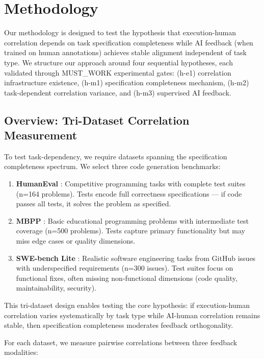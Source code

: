 \section{Methodology}

Our methodology is designed to test the hypothesis that execution-human correlation depends on task specification completeness while AI feedback (when trained on human annotations) achieves stable alignment independent of task type. We structure our approach around four sequential hypotheses, each validated through MUST\_WORK experimental gates: (h-e1) correlation infrastructure existence, (h-m1) specification completeness mechanism, (h-m2) task-dependent correlation variance, and (h-m3) supervised AI feedback.

\subsection{Overview: Tri-Dataset Correlation Measurement}

To test task-dependency, we require datasets spanning the specification completeness spectrum. We select three code generation benchmarks:

\begin{enumerate}
\item \textbf{HumanEval} \cite{chen2021evaluating}: Competitive programming tasks with complete test suites (n=164 problems). Tests encode full correctness specifications --- if code passes all tests, it solves the problem as specified.

\item \textbf{MBPP} \cite{austin2021program}: Basic educational programming problems with intermediate test coverage (n=500 problems). Tests capture primary functionality but may miss edge cases or quality dimensions.

\item \textbf{SWE-bench Lite} \cite{jimenez2023swe}: Realistic software engineering tasks from GitHub issues with underspecified requirements (n=300 issues). Test suites focus on functional fixes, often missing non-functional dimensions (code quality, maintainability, security).
\end{enumerate}

This tri-dataset design enables testing the core hypothesis: if execution-human correlation varies systematically by task type while AI-human correlation remains stable, then specification completeness moderates feedback orthogonality.

For each dataset, we measure pairwise correlations between three feedback modalities:

